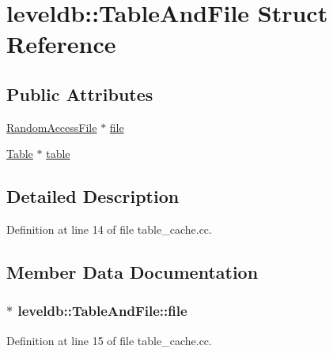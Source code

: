 \hypertarget{structleveldb_1_1_table_and_file}{}\section{leveldb\+:\+:Table\+And\+File Struct Reference}
\label{structleveldb_1_1_table_and_file}
\subsection*{Public Attributes}
\begin{DoxyCompactItemize}
\item 
\hyperlink{classleveldb_1_1_random_access_file}{Random\+Access\+File} $\ast$ \hyperlink{structleveldb_1_1_table_and_file_a7f1f72d4654e4ab49aab750330036edb}{file}
\item 
\hyperlink{classleveldb_1_1_table}{Table} $\ast$ \hyperlink{structleveldb_1_1_table_and_file_ab2df8b8a6c028cfcf36885fe76f48c99}{table}
\end{DoxyCompactItemize}


\subsection{Detailed Description}


Definition at line 14 of file table\+\_\+cache.\+cc.



\subsection{Member Data Documentation}
\hypertarget{structleveldb_1_1_table_and_file_a7f1f72d4654e4ab49aab750330036edb}{}
\subsubsection[{file}]{$\ast$ leveldb\+::\+Table\+And\+File\+::file}\label{structleveldb_1_1_table_and_file_a7f1f72d4654e4ab49aab750330036edb}


Definition at line 15 of file table\+\_\+cache.\+cc.

\hypertarget{structleveldb_1_1_table_and_file_ab2df8b8a6c028cfcf36885fe76f48c99}{}
